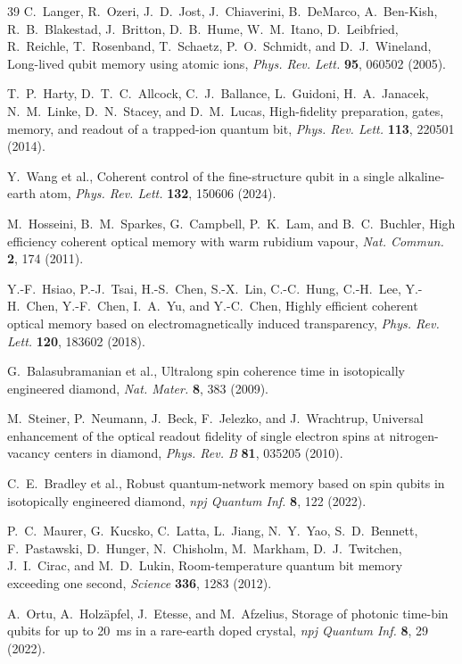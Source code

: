 \documentclass[quantumrep,article,submit,moreauthors]{Definitions/mdpi}
\begin{document}
\begin{thebibliography}{39}
C.~Langer, R.~Ozeri, J.~D.~Jost, J.~Chiaverini, B.~DeMarco, A.~Ben-Kish, R.~B.~Blakestad, J.~Britton, D.~B.~Hume, W.~M.~Itano, D.~Leibfried, R.~Reichle, T.~Rosenband, T.~Schaetz, P.~O.~Schmidt, and D.~J.~Wineland,
Long-lived qubit memory using atomic ions,
\textit{Phys. Rev. Lett.} \textbf{95}, 060502 (2005).

T.~P.~Harty, D.~T.~C.~Allcock, C.~J.~Ballance, L.~Guidoni, H.~A.~Janacek, N.~M.~Linke, D.~N.~Stacey, and D.~M.~Lucas,
High-fidelity preparation, gates, memory, and readout of a trapped-ion quantum bit,
\textit{Phys. Rev. Lett.} \textbf{113}, 220501 (2014).

Y.~Wang et al.,
Coherent control of the fine-structure qubit in a single alkaline-earth atom,
\textit{Phys. Rev. Lett.} \textbf{132}, 150606 (2024).

M.~Hosseini, B.~M.~Sparkes, G.~Campbell, P.~K.~Lam, and B.~C.~Buchler,
High efficiency coherent optical memory with warm rubidium vapour,
\textit{Nat. Commun.} \textbf{2}, 174 (2011).

Y.-F.~Hsiao, P.-J.~Tsai, H.-S.~Chen, S.-X.~Lin, C.-C.~Hung, C.-H.~Lee, Y.-H.~Chen, Y.-F.~Chen, I.~A.~Yu, and Y.-C.~Chen,
Highly efficient coherent optical memory based on electromagnetically induced transparency,
\textit{Phys. Rev. Lett.} \textbf{120}, 183602 (2018).

G.~Balasubramanian et al.,
Ultralong spin coherence time in isotopically engineered diamond,
\textit{Nat. Mater.} \textbf{8}, 383 (2009).

M.~Steiner, P.~Neumann, J.~Beck, F.~Jelezko, and J.~Wrachtrup,
Universal enhancement of the optical readout fidelity of single electron spins at nitrogen-vacancy centers in diamond,
\textit{Phys. Rev. B} \textbf{81}, 035205 (2010).

C.~E.~Bradley et al.,
Robust quantum-network memory based on spin qubits in isotopically engineered diamond,
\textit{npj Quantum Inf.} \textbf{8}, 122 (2022).

P.~C.~Maurer, G.~Kucsko, C.~Latta, L.~Jiang, N.~Y.~Yao, S.~D.~Bennett, F.~Pastawski, D.~Hunger, N.~Chisholm, M.~Markham, D.~J.~Twitchen, J.~I.~Cirac, and M.~D.~Lukin,
Room-temperature quantum bit memory exceeding one second,
\textit{Science} \textbf{336}, 1283 (2012).

A.~Ortu, A.~Holz\"apfel, J.~Etesse, and M.~Afzelius,
Storage of photonic time-bin qubits for up to 20~ms in a rare-earth doped crystal,
\textit{npj Quantum Inf.} \textbf{8}, 29 (2022).


\end{thebibliography}
\end{document}

